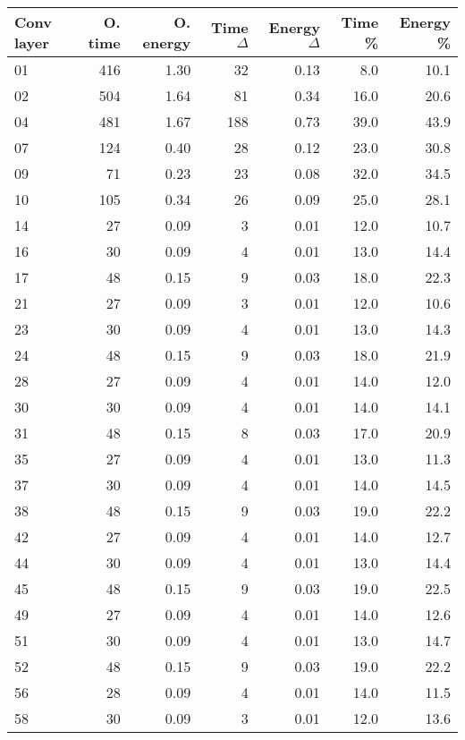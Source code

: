 \begin{table}
\centering
\begin{tabular}{|l|r|r|r|r|r|r|}
\hline
Conv layer & O. time & O. energy & Time $\Delta$ & Energy $\Delta$ & Time \% & Energy \% \\\hline
01 & 416 & 1.30 & 32 & 0.13 & 8.0 & 10.1 \\\hline
02 & 504 & 1.64 & 81 & 0.34 & 16.0 & 20.6 \\\hline
04 & 481 & 1.67 & 188 & 0.73 & 39.0 & 43.9 \\\hline
07 & 124 & 0.40 & 28 & 0.12 & 23.0 & 30.8 \\\hline
09 & 71 & 0.23 & 23 & 0.08 & 32.0 & 34.5 \\\hline
10 & 105 & 0.34 & 26 & 0.09 & 25.0 & 28.1 \\\hline
14 & 27 & 0.09 & 3 & 0.01 & 12.0 & 10.7 \\\hline
16 & 30 & 0.09 & 4 & 0.01 & 13.0 & 14.4 \\\hline
17 & 48 & 0.15 & 9 & 0.03 & 18.0 & 22.3 \\\hline
21 & 27 & 0.09 & 3 & 0.01 & 12.0 & 10.6 \\\hline
23 & 30 & 0.09 & 4 & 0.01 & 13.0 & 14.3 \\\hline
24 & 48 & 0.15 & 9 & 0.03 & 18.0 & 21.9 \\\hline
28 & 27 & 0.09 & 4 & 0.01 & 14.0 & 12.0 \\\hline
30 & 30 & 0.09 & 4 & 0.01 & 14.0 & 14.1 \\\hline
31 & 48 & 0.15 & 8 & 0.03 & 17.0 & 20.9 \\\hline
35 & 27 & 0.09 & 4 & 0.01 & 13.0 & 11.3 \\\hline
37 & 30 & 0.09 & 4 & 0.01 & 14.0 & 14.5 \\\hline
38 & 48 & 0.15 & 9 & 0.03 & 19.0 & 22.2 \\\hline
42 & 27 & 0.09 & 4 & 0.01 & 14.0 & 12.7 \\\hline
44 & 30 & 0.09 & 4 & 0.01 & 13.0 & 14.4 \\\hline
45 & 48 & 0.15 & 9 & 0.03 & 19.0 & 22.5 \\\hline
49 & 27 & 0.09 & 4 & 0.01 & 14.0 & 12.6 \\\hline
51 & 30 & 0.09 & 4 & 0.01 & 13.0 & 14.7 \\\hline
52 & 48 & 0.15 & 9 & 0.03 & 19.0 & 22.2 \\\hline
56 & 28 & 0.09 & 4 & 0.01 & 14.0 & 11.5 \\\hline
58 & 30 & 0.09 & 3 & 0.01 & 12.0 & 13.6 \\\hline

\end{tabular}
\end{table}
